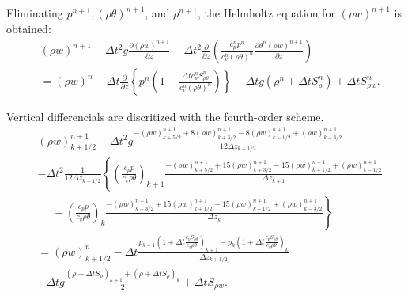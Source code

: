 Eliminating $p^{n+1}, (\rho\theta)^{n+1}$, and $\rho^{n+1}$, the Helmholtz equation for $(\rho w)^{n+1}$ is obtained:
\begin{align}
  &
  (\rho w)^{n+1}
  - \Delta t^2 g \frac{\partial (\rho w)^{n+1}}{\partial z}
  - \Delta t^2 \frac{\partial}{\partial z}\left(\frac{c_p^n p^n}{c_v^n (\rho\theta)^n}\frac{\partial \theta^n (\rho w)^{n+1}}{\partial z}\right) \nonumber\\
  &= (\rho w)^n
  - \Delta t \frac{\partial}{\partial z}\left\{p^n\left(1+\frac{\Delta t c_p^n S_{\rho\theta}^n}{c_v^n (\rho\theta)^n}\right)\right\}
  - \Delta t g (\rho^n + \Delta t S_\rho^n)
  + \Delta t S_{\rho w}^n.
\end{align}

Vertical differencials are discritized with the fourth-order scheme.
\begin{align}
&
  (\rho w)_{k+1/2}^{n+1}
  -\Delta t^2 g\frac{-(\rho w)_{k+5/2}^{n+1}+8(\rho w)_{k+3/2}^{n+1}-8(\rho w)_{k-1/2}^{n+1}+(\rho w)_{k-3/2}^{n+1}}{12\Delta z_{k+1/2}}  \nonumber\\ &
  -\Delta t^2 \frac{1}{12\Delta z_{k+1/2}}\left\{
  \left(\frac{c_pp}{c_v\rho\theta}\right)_{k+1}\frac{-(\rho w)_{k+5/2}^{n+1}+15(\rho w)_{k+3/2}^{n+1}-15(\rho w)_{k+1/2}^{n+1}+(\rho w)_{k-1/2}^{n+1}}{\Delta z_{k+1}}
  \right. \nonumber\\ & \left.\:\:\:\:\:\:
  -\left(\frac{c_pp}{c_v\rho\theta}\right)_k\frac{-(\rho w)_{k+3/2}^{n+1}+15(\rho w)_{k+1/2}^{n+1}-15(\rho w)_{k-1/2}^{n+1}+(\rho w)_{k-3/2}^{n+1}}{\Delta z_k} \right\} \nonumber\\
  &=
  (\rho w)_{k+1/2}^n -\Delta t\frac{
  p_{k+1}\left(1+\Delta t\frac{c_pS_{\rho\theta}}{c_v\rho\theta}\right)_{k+1}
  - p_k\left(1+\Delta t\frac{c_pS_{\rho\theta}}{c_v\rho\theta}\right)_k}{\Delta z_{k+1/2}} \nonumber\\ &
  -\Delta t g \frac{(\rho+\Delta t S_\rho)_{k+1}+(\rho+\Delta t S_\rho)_k}{2} + \Delta t S_{\rho w}.
\end{align}

